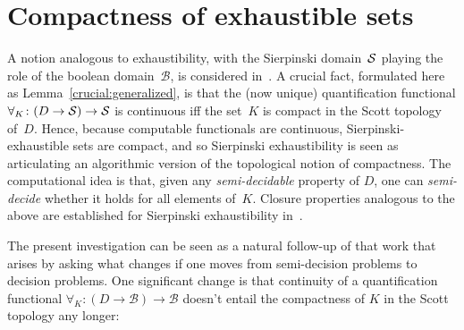 \documentclass{LMCS}
\newcommand{\pBool}{\mathcal{B}}
\newcommand{\D}{D}
\begin{document}
\section{Compactness of exhaustible sets} \label{criteria}

A notion analogous to exhaustibility, with the Sierpinski
domain~$\mathcal{S}$ playing the role of the boolean
domain~$\pBool$, is considered in~\cite{escardo:barbados}.  A crucial
fact, formulated here as Lemma~\ref{crucial:generalized}, is that the
(now unique) quantification functional $\forall_K \colon (\D \to \Sierp)
\to \Sierp$ is continuous iff the set~$K$ is compact in the Scott
topology of~$\D$.  Hence, because computable functionals are
continuous, Sierpinski-exhaustible sets are compact, and so Sierpinski
exhaustibility is seen as articulating an algorithmic version of the
topological notion of compactness. The computational idea is that,
given any \emph{semi-decidable} property of $\D$, one can
\emph{semi-decide} whether it holds for all elements of~$K$. Closure
properties analogous to the above are established for Sierpinski
exhaustibility in~\cite{escardo:barbados}. 

The present investigation can be seen as a natural follow-up of that
work that arises by asking what changes if one moves from
semi-decision problems to decision problems.  One significant change
is that continuity of a quantification functional $\forall_K \colon
(\D \to \pBool) \to \pBool$ doesn't entail the compactness of $K$ in
the Scott topology any longer:
\end{document}
